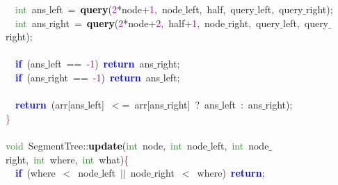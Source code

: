 {{\mbox{}\ \ \textcolor{ForestGreen}{int}\ ans$\_$left\ \textcolor{BrickRed}{=}\ \textbf{\textcolor{Black}{query}}\textcolor{BrickRed}{(}\textcolor{Purple}{2}\textcolor{BrickRed}{*}node\textcolor{BrickRed}{+}\textcolor{Purple}{1}\textcolor{BrickRed}{,}\ node$\_$left\textcolor{BrickRed}{,}\ half\textcolor{BrickRed}{,}\ query$\_$left\textcolor{BrickRed}{,}\ query$\_$right\textcolor{BrickRed}{);} \\
\mbox{}\ \ \textcolor{ForestGreen}{int}\ ans$\_$right\ \textcolor{BrickRed}{=}\ \textbf{\textcolor{Black}{query}}\textcolor{BrickRed}{(}\textcolor{Purple}{2}\textcolor{BrickRed}{*}node\textcolor{BrickRed}{+}\textcolor{Purple}{2}\textcolor{BrickRed}{,}\ half\textcolor{BrickRed}{+}\textcolor{Purple}{1}\textcolor{BrickRed}{,}\ node$\_$right\textcolor{BrickRed}{,}\ query$\_$left\textcolor{BrickRed}{,}\ query$\_$right\textcolor{BrickRed}{);} \\
\mbox{} \\
\mbox{}\ \ \textbf{\textcolor{Blue}{if}}\ \textcolor{BrickRed}{(}ans$\_$left\ \textcolor{BrickRed}{==}\ \textcolor{BrickRed}{-}\textcolor{Purple}{1}\textcolor{BrickRed}{)}\ \textbf{\textcolor{Blue}{return}}\ ans$\_$right\textcolor{BrickRed}{;} \\
\mbox{}\ \ \textbf{\textcolor{Blue}{if}}\ \textcolor{BrickRed}{(}ans$\_$right\ \textcolor{BrickRed}{==}\ \textcolor{BrickRed}{-}\textcolor{Purple}{1}\textcolor{BrickRed}{)}\ \textbf{\textcolor{Blue}{return}}\ ans$\_$left\textcolor{BrickRed}{;} \\
\mbox{} \\
\mbox{}\ \ \textbf{\textcolor{Blue}{return}}\ \textcolor{BrickRed}{(}arr\textcolor{BrickRed}{[}ans$\_$left\textcolor{BrickRed}{]}\ \textcolor{BrickRed}{$<$=}\ arr\textcolor{BrickRed}{[}ans$\_$right\textcolor{BrickRed}{]}\ \textcolor{BrickRed}{?}\ ans$\_$left\ \textcolor{BrickRed}{:}\ ans$\_$right\textcolor{BrickRed}{);} \\
\mbox{}\textcolor{Red}{\}} \\
\mbox{} \\
\mbox{}\textcolor{ForestGreen}{void}\ SegmentTree\textcolor{BrickRed}{::}\textbf{\textcolor{Black}{update}}\textcolor{BrickRed}{(}\textcolor{ForestGreen}{int}\ node\textcolor{BrickRed}{,}\ \textcolor{ForestGreen}{int}\ node$\_$left\textcolor{BrickRed}{,}\ \textcolor{ForestGreen}{int}\ node$\_$right\textcolor{BrickRed}{,}\ \textcolor{ForestGreen}{int}\ where\textcolor{BrickRed}{,}\ \textcolor{ForestGreen}{int}\ what\textcolor{BrickRed}{)}\textcolor{Red}{\{} \\
\mbox{}\ \ \textbf{\textcolor{Blue}{if}}\ \textcolor{BrickRed}{(}where\ \textcolor{BrickRed}{$<$}\ node$\_$left\ \textcolor{BrickRed}{$|$$|$}\ node$\_$right\ \textcolor{BrickRed}{$<$}\ where\textcolor{BrickRed}{)}\ \textbf{\textcolor{Blue}{return}}\textcolor{BrickRed}{;} \\
}}

